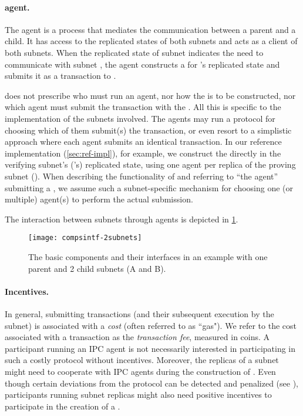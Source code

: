 \paragraph{\ipc agent.}

The \ipc agent is a process that mediates the communication between a parent and a child.
It has access to the replicated states of both subnets and acts as a client of both subnets.
When the replicated state of subnet  indicates the need to communicate with subnet ,
the \ipc agent constructs a \pof for 's replicated state and submits it as a transaction to .

\ipc does not prescribe who must run an \ipc agent, nor how the \pof is to be constructed, nor which \ipc agent must submit the transaction with the \pof.
All this is specific to the implementation of the subnets involved.
The \ipc agents may run a protocol for choosing which of them submit(s) the transaction, or even resort to a simplistic approach where each \ipc agent submits an identical transaction.
In our reference implementation (\cref{sec:ref-impl}), for example, we construct the \pof directly in the verifying subnet's ('s) replicated state,
using one \ipc agent per replica of the proving subnet ().
When describing the functionality of \ipc and referring to ``the \ipc agent'' submitting a \pof,
we assume such a subnet-specific mechanism for choosing one (or multiple) \ipc agent(s) to perform the actual submission.

The interaction between subnets through \ipc agents is depicted in \cref{fig:interfaces}.

\begin{figure}[ht]
     \centering
     \texttt{[image: compsintf-2subnets]}
     \caption{The basic \ipc components and their interfaces in an example with one parent and 2 child subnets (A and B).}
     \label{fig:interfaces}
 \end{figure}


\paragraph{Incentives.}

In general, submitting transactions (and their subsequent execution by the subnet) is associated with a \emph{cost} (often referred to as ``gas").
We refer to the cost associated with a transaction as the \emph{transaction fee}, measured in coins.
A participant running an IPC agent is not necessarily interested in participating in such a costly protocol without incentives.
Moreover, the replicas of a subnet might need to cooperate with IPC agents during the construction of \pofsFull.
Even though certain deviations from the protocol can be detected and penalized (see ),
participants running subnet replicas might also need positive incentives to participate in the creation of a \pof.


